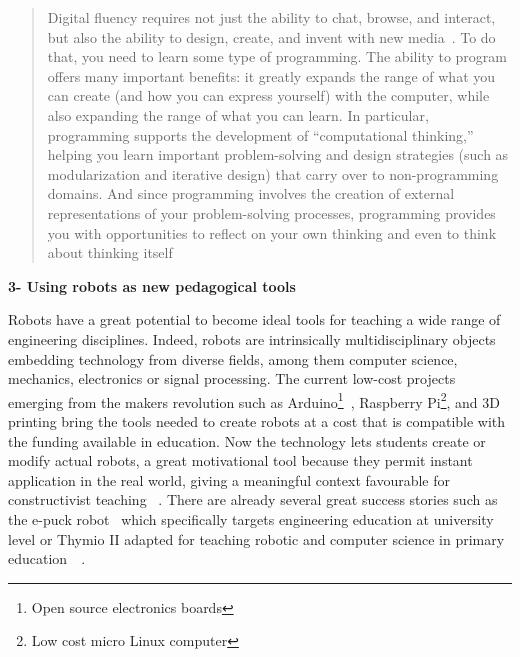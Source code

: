 \begin{quotation}
    Digital fluency requires not just the ability to chat, browse, and interact, but also the ability to design, create, and invent with new media~\cite{resnick2008sowing}. To do that, you need to learn some type of programming. The ability to program offers many important benefits: it greatly expands the range of what you can create (and how you can express yourself) with the computer, while also expanding the range of what you can learn. In particular, programming supports the development of “computational thinking,” helping you learn important problem-solving and design strategies (such as modularization and iterative design) that carry over to non-programming domains. And since programming involves the creation of external representations of your problem-solving processes, programming provides you with opportunities to reflect on your own thinking and even to think about thinking itself~\cite{disessa2001changing}


\end{quotation}


\textbf{3- Using robots as new pedagogical tools}

Robots have a great potential to become ideal tools for teaching a wide range of engineering disciplines. Indeed, robots are intrinsically multidisciplinary objects embedding technology from diverse fields, among them computer science, mechanics, electronics or signal processing.
The current low-cost projects emerging from the makers revolution\cite{anderson2012makers} such as Arduino\footnote{Open source electronics boards}~\cite{mellis2007arduino}, Raspberry Pi\footnote{Low cost micro Linux computer}, and 3D printing bring the tools needed to create robots at a cost that is compatible with the funding available in education. Now the technology lets students create or modify actual robots, a great motivational tool because they permit instant application in the real world, giving a meaningful context favourable for constructivist teaching~\cite{palincsar1998social} \cite{papert1991situating}.
There are already several great success stories such as the e-puck robot~\cite{mondada2009puck} which specifically targets engineering education at university level or Thymio II adapted for teaching robotic and computer science in primary education~\cite{riedo2012two}~\cite{riedo2013thymio}.



